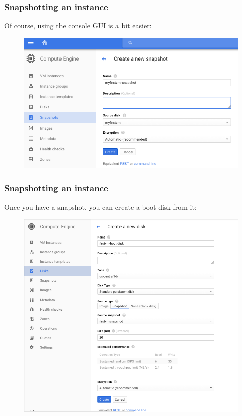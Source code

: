 \documentclass[9pt]{beamer}
\begin{document}
\begin{frame}[fragile]
  \frametitle{Snapshotting an instance}
  Of course, using the console GUI is a bit easier:
  \begin{figure}
    \includegraphics[scale=0.3]{figures/SnapshotVM.png}
  \end{figure}
\end{frame}

\begin{frame}[fragile]
  \frametitle{Snapshotting an instance}
  Once you have a snapshot, you can create a boot disk from it:
\begin{figure}
  \includegraphics[scale=0.3]{figures/BootDisk.png}
\end{figure}
\end{frame}
\end{document}

